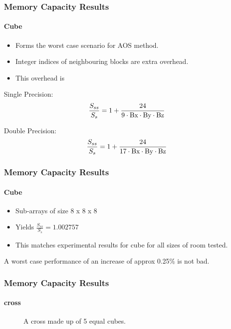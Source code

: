 \documentclass{beamer}
\begin{document}
\begin{frame}
\frametitle{Memory Capacity Results}
\framesubtitle{Cube}
\begin{itemize}
\item Forms the worst case scenario for AOS method.
\item Integer indices of neighbouring blocks are extra overhead.
\item This overhead is
\end{itemize}

Single Precision:
\begin{equation}
\frac{S_{ss}}{S_{s}} = 1 + \frac{24}{9\cdot\lstinline|Bx|\cdot\lstinline|By|\cdot\lstinline|Bz|}
\label{equation:single-neghbours}
\end{equation}

Double Precision:
\begin{equation}
\frac{S_{ss}}{S_{s}} = 1 + \frac{24}{17\cdot\lstinline|Bx|\cdot\lstinline|By|\cdot\lstinline|Bz|}
\label{equation:double-neghbours}
\end{equation}
\end{frame}

\begin{frame}
\frametitle{Memory Capacity Results}
\framesubtitle{Cube}
\begin{itemize}
\item Sub-arrays of size 8 x 8 x 8
\item Yields $\frac{S_{ss}}{S_{s}} = 1.002757$
\item This matches experimental results for cube for all sizes of room tested.
\end{itemize}

A worst case performance of an increase of approx 0.25\% is not bad.
\end{frame}

\begin{frame}[fragile]
\frametitle{Memory Capacity Results}
\framesubtitle{cross}
\begin{figure}[H]
\centering
{}
\caption{A cross made up of 5 equal cubes.}
\label{figure:cross}
\end{figure}
\end{frame}
\end{document}
